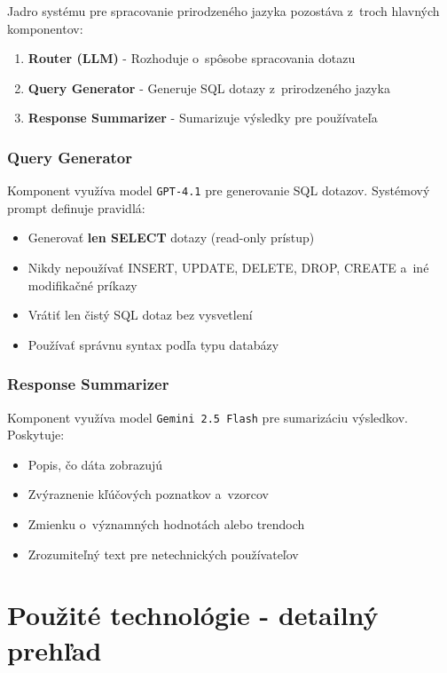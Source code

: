 \documentclass[a4paper, 12pt]{article}
\begin{document}
Jadro systému pre spracovanie prirodzeného jazyka pozostáva z~troch hlavných komponentov:

\begin{enumerate}
    \item \textbf{Router (LLM)} - Rozhoduje o~spôsobe spracovania dotazu
    \item \textbf{Query Generator} - Generuje SQL dotazy z~prirodzeného jazyka
    \item \textbf{Response Summarizer} - Sumarizuje výsledky pre používateľa
\end{enumerate}

\subsubsection{Query Generator}

Komponent využíva model \texttt{GPT-4.1} pre generovanie SQL dotazov. Systémový prompt definuje pravidlá:
\begin{itemize}
    \item Generovať \textbf{len SELECT} dotazy (read-only prístup)
    \item Nikdy nepoužívať INSERT, UPDATE, DELETE, DROP, CREATE a~iné modifikačné príkazy
    \item Vrátiť len čistý SQL dotaz bez vysvetlení
    \item Používať správnu syntax podľa typu databázy
\end{itemize}

\subsubsection{Response Summarizer}

Komponent využíva model \texttt{Gemini 2.5 Flash} pre sumarizáciu výsledkov. Poskytuje:
\begin{itemize}
    \item Popis, čo dáta zobrazujú
    \item Zvýraznenie kľúčových poznatkov a~vzorcov
    \item Zmienku o~významných hodnotách alebo trendoch
    \item Zrozumiteľný text pre netechnických používateľov
\end{itemize}

\clearpage

\section{Použité technológie - detailný prehľad}
\end{document}
